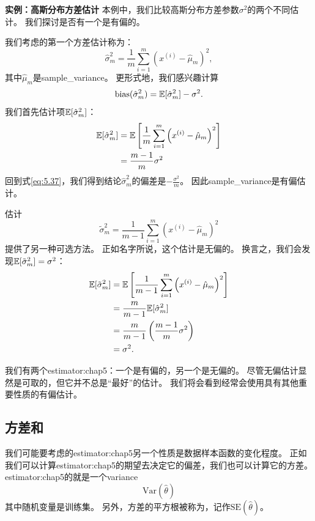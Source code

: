 
\textbf{实例：高斯分布方差估计}\quad 
本例中，我们比较高斯分布方差参数$\sigma^2$的两个不同估计。
我们探讨是否有一个是有偏的。

我们考虑的第一个方差估计称为：
\begin{equation}
    \hat{\sigma}_m^2 = \frac{1}{m} \sum_{i=1}^m \left( x^{(i)} - \hat{\mu}_m \right)^2,
\end{equation}
其中$\hat{\mu}_m$是\gls{sample_variance}。
更形式地，我们感兴趣计算
\begin{equation}
\label{eq:5.37}
    \text{bias} (\hat{\sigma}_m^2) = \mathbb{E} [ \hat{\sigma}_m^2 ]  - \sigma^2.
\end{equation}
我们首先估计项$\mathbb{E} [ \hat{\sigma}_m^2 ]$：
\begin{align}
    \mathbb{E} [ \hat{\sigma}_m^2 ]  &= \mathbb{E} \left[ \frac{1}{m} \sum_{i=1}^m \left( x^{(i)} - \hat{\mu}_m \right)^2  \right] \\
    &= \frac{m-1}{m} \sigma^2
\end{align}
回到式\ref{eq:5.37}，我们得到结论$\hat{\sigma}^2_m$的偏差是$-\frac{\sigma^2}{m}$。
因此\gls{sample_variance}是有偏估计。

估计
\begin{equation}
    \tilde{\sigma}_m^2 = \frac{1}{m-1} \sum_{i=1}^m \left( x^{(i)} - \hat{\mu}_m \right)^2
\end{equation}
提供了另一种可选方法。
正如名字所说，这个估计是无偏的。
换言之，我们会发现$\mathbb{E}[\tilde{\sigma}_m^2] = \sigma^2$：
\begin{align}
    \mathbb{E}[\tilde{\sigma}_m^2] &= \mathbb{E} \left[ \frac{1}{m-1} \sum_{i=1}^m \left( x^{(i)} - \hat{\mu}_m \right)^2 \right] \\
        &= \frac{m}{m-1} \mathbb{E}[ \hat{\sigma}_m^2 ]  \\
        &= \frac{m}{m-1} \left( \frac{m-1}{m} \sigma^2 \right) \\
        &= \sigma^2.
\end{align}


我们有两个\gls{estimator:chap5}：一个是有偏的，另一个是无偏的。
尽管无偏估计显然是可取的，但它并不总是``最好''的估计。
我们将会看到经常会使用具有其他重要性质的有偏估计。

\subsection{方差和}
\label{sec:variance_and_standard_error}
我们可能要考虑的\gls{estimator:chap5}另一个性质是数据样本函数的变化程度。
正如我们可以计算\gls{estimator:chap5}的期望去决定它的偏差，我们也可以计算它的方差。
\gls{estimator:chap5}的就是一个\gls{variance}
\begin{equation}
    \text{Var}(\hat{\theta})
\end{equation}
其中随机变量是训练集。
另外，方差的平方根被称为，记作$\text{SE}(\hat{\theta})$。

